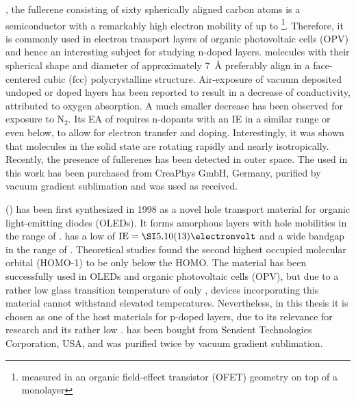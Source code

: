 \CS, the fullerene consisting of sixty spherically aligned carbon atoms is a semiconductor with a remarkably high electron mobility of up to \mob[4.9]\cite{Itaka2006}\footnote{measured in an organic field-effect transistor (OFET) geometry on top of a \pen monolayer}. Therefore, it is commonly used in electron transport layers of organic photovoltaic cells (OPV) and hence an interesting subject for studying n-doped layers. \CS molecules with their spherical shape and diameter of approximately \SI{7}{\angstrom} preferably align in a face-centered cubic (fcc) polycrystalline structure\cite{Peimo1993}. Air-exposure of vacuum deposited undoped or doped \CS layers has been reported to result in a decrease of conductivity, attributed to oxygen absorption\cite{Hamed1993,Fujimori1994}. A much smaller decrease has been observed for exposure to N$_2$\cite{Fujimori1994}.
Its \EA EA of \cite{Zhao2009} requires n-dopants with an \IE IE in a similar range or even below, to allow for electron transfer and doping.
Interestingly, it was shown that \CS molecules in the solid state are rotating rapidly and nearly isotropically\cite{Tycko1991}. Recently, the presence of fullerenes has been detected in outer space\cite{Cami2010,Lohrmann1823}.
The \CS used in this work has been purchased from CreaPhys GmbH, Germany, purified by vacuum gradient sublimation and was used as received.

\minisec{\meo} %
\meo (\meoLong) has been first synthesized in 1998\cite{Thelakkat1998} as a novel hole transport material for organic light-emitting diodes (OLEDs). It forms amorphous layers\cite{Pfeiffer2003} with hole mobilities in the range of \mob[2.3E-05]\mphOFET. \meo has a low \IE of \mbox{$\text{IE}=\eV{5.10(13)}$}\cite{Olthof2009,Tietze2012} and a wide bandgap in the range of \Egap[3.2]\cite{He2004a}.
Theoretical studies found the second highest occupied molecular orbital (HOMO-1) to be only  below the HOMO\cite{Matis2010}.
The material has been successfully used in OLEDs\cite{He2004} and organic photovoltaic cells (OPV)\cite{Drechsel2004}, but due to a rather low glass transition temperature of only \Tg[67]\cite{Thelakkat1998}, devices incorporating this material cannot withstand elevated temperatures. Nevertheless, in this thesis it is chosen as one of the host materials for p-doped layers, due to its relevance for research and its rather low \IE. 
\meo has been bought from Sensient Technologies Corporation, USA, and was purified twice by vacuum gradient sublimation.

